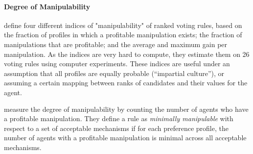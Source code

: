 \paragraph{Degree of Manipulability}
\citet{aleskerov1999degree} define four different indices of "manipulability" of ranked voting rules, based on the fraction of profiles in which a profitable manipulation exists; the fraction of manipulations that are profitable; and the average and maximum gain per manipulation.
As the indices are very hard to compute, they estimate them on 26 voting rules using computer experiments. These indices are useful under an assumption that all profiles are equally probable (``impartial culture''), or assuming a certain mapping between ranks of candidates and their values for the agent.

\citet{andersson2014budget,andersson2014least} measure the degree of manipulability by counting the number of agents who have a profitable manipulation. They define a rule as \emph{minimally manipulable} with respect to a set of acceptable mechanisms if for each preference profile, the number of agents with a profitable manipulation is minimal across all acceptable mechanisms.



\iffalse
\paragraph{Other Related Notions}
\citet{tamuz2018non} study cake-cutting among two agents. 
They assume that different cutters play cut-and-choose repeatedly with the same chooser, and may observe the previous choices of the chooser. They develop protocols that are \emph{non-exploitable} in the sense that observing previous choices does not help the cutter make a cut that will give him more than $1/2$ of the total cake value.

\citet{cresto2022fair} study regret in fair cake-cutting among two agents, where the regret comes from a change in preferences: after one player sees the choice of the other player, his preferences may change. They suggest a variant of cut and choose that avoids this kind of regret. 

\citet{manurangsi2023differentially} study differential privacy in the context of fair division. Can it help to reduce manipulability?
\fi

